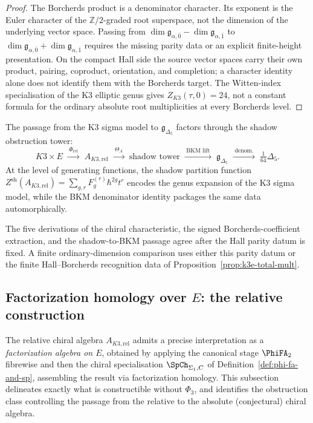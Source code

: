 \begin{proof}
The Borcherds product is a denominator character. Its exponent is the
Euler character of the $\mathbb Z/2$-graded root superspace, not the
dimension of the underlying vector space. Passing from
$\dim\mathfrak g_{\alpha,\bar0}-\dim\mathfrak g_{\alpha,\bar1}$ to
$\dim\mathfrak g_{\alpha,\bar0}+\dim\mathfrak g_{\alpha,\bar1}$
requires the missing parity data or an explicit finite-height
presentation. On the compact Hall side the source vector spaces carry
their own product, pairing, coproduct, orientation, and completion; a
character identity alone does not identify them with the Borcherds
target. The Witten-index specialisation of the K3 elliptic genus gives
$Z_{K3}(\tau,0)=24$, not a constant formula for the ordinary absolute
root multiplicities at every Borcherds level.
\end{proof}

\begin{construction}
\label{constr:k3e-shadow-bkm-bridge}
The passage from the K3 sigma model to $\mathfrak{g}_{\Delta_5}$ factors through the shadow obstruction tower:
\[
 K3 \times E \;\xrightarrow{\;\Phi_{\mathrm{rel}}\;}\; A_{K3,\mathrm{rel}} \;\xrightarrow{\;\Theta_A\;}\; \text{shadow tower} \;\xrightarrow{\;\text{BKM lift}\;}\; \mathfrak{g}_{\Delta_5} \;\xrightarrow{\;\text{denom.}\;}\; \tfrac{1}{64}\Delta_5.
\]
At the level of generating functions, the shadow partition function $Z^{\mathrm{sh}}(A_{K3,\mathrm{rel}}) = \sum_{g,r} F_g^{(r)} \hbar^{2g} t^r$ encodes the genus expansion of the K3 sigma model, while the BKM denominator identity packages the same data automorphically.
\end{construction}

\noindent
The five derivations of the chiral characteristic, the signed
Borcherds-coefficient extraction, and the shadow-to-BKM passage agree
after the Hall parity datum is fixed. A finite ordinary-dimension
comparison uses either this parity datum or the finite
Hall--Borcherds recognition data of
Proposition~\ref{prop:k3e-total-mult}.


\subsection{Factorization homology over \texorpdfstring{$E$}{E}: the relative construction}
\label{sec:k3e-relative-fact-hom}

The relative chiral algebra $A_{K3,\mathrm{rel}}$ admits a precise
interpretation as a \emph{factorization algebra on $E$}, obtained by
applying the canonical stage $\PhiFA_2$ fibrewise and then the
chiral specialisation $\SpCh_{\Sigma_1, C}$ of Definition~\ref{def:phi-fa-and-sp},
assembling the result via factorization homology. This subsection
delineates exactly what is constructible without $\Phi_3$, and
identifies the obstruction class controlling the passage from the
relative to the absolute (conjectural) chiral algebra.

